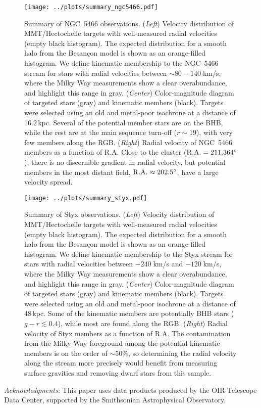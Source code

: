 \documentclass[modern]{aastex61}
\begin{document}
\begin{figure}
\begin{center}
\texttt{[image: ../plots/summary\_ngc5466.pdf]}
\caption{Summary of NGC~5466 observations.
(\emph{Left}) Velocity distribution of MMT/Hectochelle targets with well-measured radial velocities (empty black histogram).
The expected distribution for a smooth halo from the Besan\c{c}on model is shown as an orange-filled histogram.
We define kinematic membership to the NGC~5466 stream for stars with radial velocities between $\sim80-140\;$km/s, where the Milky Way measurements show a clear overabundance, and highlight this range in gray.
(\emph{Center}) Color-magnitude diagram of targeted stars (gray) and kinematic members (black).
Targets were selected using an old and metal-poor isochrone at a distance of 16.2\,kpc.
Several of the potential member stars are on the BHB, while the rest are at the main sequence turn-off ($r\sim19$), with very few members along the RGB.
(\emph{Right}) Radial velocity of NGC~5466 members as a function of R.A.
Close to the cluster ($\rm R.A.=211.364^\circ$), there is no discernible gradient in radial velocity, but potential members in the most distant field, $\rm R.A.\approx202.5^\circ$, have a large velocity spread.}
\label{fig:summary_ngc5466}
\end{center}
\end{figure}

\begin{figure}
\begin{center}
\texttt{[image: ../plots/summary\_styx.pdf]}
\caption{Summary of Styx observations.
(\emph{Left}) Velocity distribution of MMT/Hectochelle targets with well-measured radial velocities (empty black histogram).
The expected distribution for a smooth halo from the Besan\c{c}on model is shown as an orange-filled histogram.
We define kinematic membership to the Styx stream for stars with radial velocities between $-240\;$km/s and $-120\;$km/s, where the Milky Way measurements show a clear overabundance, and highlight this range in gray.
(\emph{Center}) Color-magnitude diagram of targeted stars (gray) and kinematic members (black).
Targets were selected using an old and metal-poor isochrone at a distance of 48\,kpc.
Some of the kinematic members are potentially BHB stars ($g-r\lesssim0.4$), while most are found along the RGB.
(\emph{Right}) Radial velocity of Styx members as a function of R.A.
The contamination from the Milky Way foreground among the potential kinematic members is on the order of $\sim50\%$, so determining the radial velocity along the stream more precisely would benefit from measuring surface gravities and removing dwarf stars from this sample.}
\label{fig:summary_styx}
\end{center}
\end{figure}

\vspace{5.5cm}
\emph{Acknowledgments:}
This paper uses data products produced by the OIR Telescope Data Center, supported by the Smithsonian Astrophysical Observatory.


\end{document}
